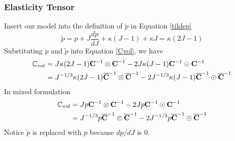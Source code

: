 %
\subsubsection{Elasticity Tensor}
Insert our model into the definition of $\tilde{p}$ in Equation \ref{tildep}
\begin{equation}
\tilde{p} = p + J\frac{dp}{dJ} + \kappa(J-1) + \kappa{J} = \kappa{(2J - 1)}
\end{equation}
Substituting $p$ and $\tilde{p}$ into Equation \ref{Cvol}, we have
\begin{equation} \label{mCvol1}
\begin{split}
\mathbb{C}_{vol} &= J\kappa{(2J-1)} \bold{C}^{-1} \otimes \bold{C}^{-1} - 2J\kappa{(J-1)} \bold{C}^{-1} \odot \bold{C}^{-1}  \\
&= J^{-1/3}\kappa{(2J-1)} \overline{\bold{C}}^{-1} \otimes \overline{\bold{C}}^{-1} - 2J^{-1/3}\kappa{(J-1)} \overline{\bold{C}}^{-1} \odot \overline{\bold{C}}^{-1}
\end{split}
\end{equation}
In mixed formulation
\begin{equation} \label{mCvol2}
\begin{split}
\mathbb{C}_{vol} &= Jp\bold{C}^{-1}\otimes\bold{C}^{-1} - 2Jp\bold{C}^{-1}\odot\bold{C}^{-1} \\
&= J^{-1/3}p\overline{\bold{C}}^{-1}\otimes\overline{\bold{C}}^{-1} - 2J^{-1/3}p\overline{\bold{C}}^{-1}\odot\overline{\bold{C}}^{-1}
\end{split}
\end{equation}
Notice $\tilde{p}$ is replaced with $p$ because ${dp}/{dJ}$ is $0$.

